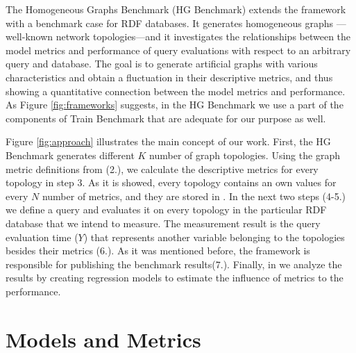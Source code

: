 The Homogeneous Graphs Benchmark (HG Benchmark) extends the \map framework with a benchmark case for RDF databases. It generates homogeneous graphs ---well-known network topologies---and it investigates the relationships between the model metrics and performance of query evaluations with respect to an arbitrary query and database. The goal is to generate artificial graphs with various characteristics and obtain a fluctuation in their descriptive metrics, and thus showing a quantitative connection between the model metrics and performance. As Figure \ref{fig:frameworks} suggests, in the HG Benchmark we use a part of the components of Train Benchmark that are adequate for our purpose as well.

Figure \ref{fig:approach} illustrates the main concept of our work. First, the HG Benchmark generates different $K$ number of graph topologies. Using the graph metric definitions from \map (2.), we calculate the descriptive metrics for every topology in step 3. As it is showed, every topology contains an own values for every $N$ number of metrics, and they are stored in \sam. In the next two steps (4-5.) we define a query and evaluates it on every topology in the particular RDF database that we intend to measure. The measurement result is the query evaluation time ($Y$) that represents another variable belonging to the topologies besides their metrics (6.). As it was mentioned before, the \sam framework is responsible for publishing the benchmark results(7.). Finally, in \map we analyze the results by creating regression models to estimate the influence of metrics to the performance.



\section{Models and Metrics}

